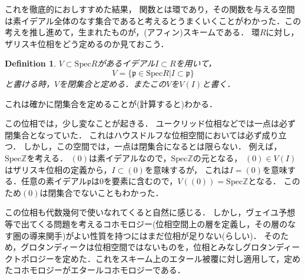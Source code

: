 \documentclass{ujarticle}
\newtheorem{dfn}[thm]{Definition}
\begin{document}
これを徹底的におしすすめた結果，
関数とは環であり，その関数を与える空間は素イデアル全体のなす集合であると考えるとうまくいくことがわかった．この考えを推し進めて，生まれたものが，(アフィン)スキームである．
環$R$に対し，ザリスキ位相をどう定めるのか見ておこう．
\begin{dfn}
 $V \subset \mathrm{Spec}R$があるイデアル$I \subset R$を用いて，
\begin{equation*}
   V = \{ \mathfrak{p} \in \mathrm{Spec}R |  I \subset \mathfrak{p} \}
\end{equation*}
と書ける時，$V$を閉集合と定める．またこの$V$を$V(I)$と書く．
\end{dfn}
これは確かに閉集合を定めることが(計算すると)わかる．

この位相では，少し変なことが起きる．
ユークリッド位相などでは一点は必ず閉集合となっていた．
これはハウスドルフな位相空間においては必ず成り立つ．
しかし，この空間では，一点は閉集合になるとは限らない．
例えば，$\mathrm{Spec}\mathbb{Z}$を考える．
$(0)$は素イデアルなので，$\mathrm{Spec}\mathbb{Z}$の元となる，
$(0) \in V(I)$はザリスキ位相の定義から，$I \subset (0)$を意味するが，
これは$I = (0)$を意味する．任意の素イデアル$\mathfrak{p}$は$0$を要素に含むので，$V((0))=\mathrm{Spec}\mathbb{Z}$となる．
このため$(0)$は閉集合でないこともわかった．

この位相も代数幾何で使いなれてくると自然に感じる．
しかし，ヴェイユ予想等で出てくる問題を考えるコホモロジー(位相空間上の層を定義し，その層のなす圏の導来関手)がよい性質を持つにはまだ位相が足りない(らしい)．
そのため，グロタンディークは位相空間ではないものを，位相とみなしグロタンディークトポロジーを定めた．これをスキーム上のエタール被覆に対し適用して，定めたコホモロジーがエタールコホモロジーである．
\end{document}
